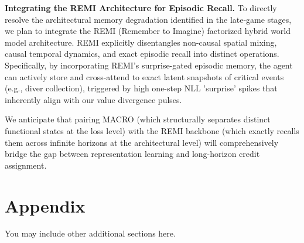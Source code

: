 \documentclass{article} %
\begin{document}
\textbf{Integrating the REMI Architecture for Episodic Recall.}
To directly resolve the architectural memory degradation identified in the late-game stages, we plan to integrate the REMI (Remember to Imagine) factorized hybrid world model architecture. REMI explicitly disentangles non-causal spatial mixing, causal temporal dynamics, and exact episodic recall into distinct operations. Specifically, by incorporating REMI's surprise-gated episodic memory, the agent can actively store and cross-attend to exact latent snapshots of critical events (e.g., diver collection), triggered by high one-step NLL 'surprise' spikes that inherently align with our value divergence pulses. 

We anticipate that pairing MACRO (which structurally separates distinct functional states at the loss level) with the REMI backbone (which exactly recalls them across infinite horizons at the architectural level) will comprehensively bridge the gap between representation learning and long-horizon credit assignment.



\section{Appendix}
You may include other additional sections here.
\end{document}
